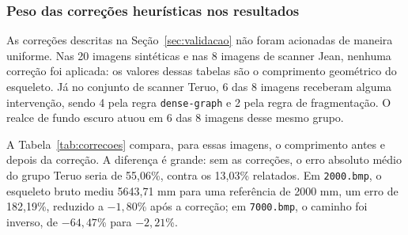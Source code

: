 \documentclass[12pt]{article}
\begin{document}
\begin{table}[!htbp]
\centering
\caption{Resultados das imagens Teruo.}
\label{tab:teruo}
\end{table}

\subsubsection{Peso das correções heurísticas nos resultados}
\label{sec:correcoes}

As correções descritas na Seção~\ref{sec:validacao} não foram acionadas de maneira uniforme. Nas 20 imagens sintéticas e nas 8 imagens de scanner Jean, nenhuma correção foi aplicada: os valores dessas tabelas são o comprimento geométrico do esqueleto. Já no conjunto de scanner Teruo, 6 das 8 imagens receberam alguma intervenção, sendo 4 pela regra \texttt{dense-graph} e 2 pela regra de fragmentação. O realce de fundo escuro atuou em 6 das 8 imagens desse mesmo grupo.

A Tabela~\ref{tab:correcoes} compara, para essas imagens, o comprimento antes e depois da correção. A diferença é grande: sem as correções, o erro absoluto médio do grupo Teruo seria de 55,06\%, contra os 13,03\% relatados. Em \texttt{2000.bmp}, o esqueleto bruto mediu 5643,71 mm para uma referência de 2000 mm, um erro de 182,19\%, reduzido a $-1,80$\% após a correção; em \texttt{7000.bmp}, o caminho foi inverso, de $-64,47$\% para $-2,21$\%.

\vspace{5mm}
\end{document}
